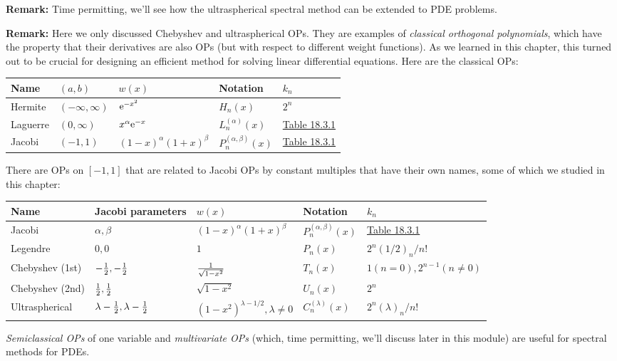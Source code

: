 \documentclass[12pt,a4paper]{article}
\begin{document}
\textbf{Remark:} Time permitting, we'll see how the ultraspherical spectral method can be extended to PDE problems.

\textbf{Remark:} Here we only discussed Chebyshev and ultraspherical OPs.  They are examples of \emph{classical orthogonal polynomials}, which have the property that their derivatives are also OPs (but with respect to different weight functions).  As we learned in this chapter, this turned out to be crucial for designing an efficient method for solving linear differential equations. Here are the classical OPs:

\begin{tabular}
{l | l | l | l | l}
Name & $(a,b)$ & $w(x)$ & Notation & $k_n$ \\
\hline
Hermite & $(-\infty,\infty)$ & ${\rm e}^{-x^2}$ & $H_n(x)$ & $2^n$ \\
Laguerre & $(0,\infty)$ & $x^\alpha {\rm e}^{-x}$ & $L_n^{(\alpha)}(x)$ & \href{http://dlmf.nist.gov/18.3}{Table 18.3.1} \\
Jacobi & $(-1,1)$ & $(1-x)^{\alpha} (1+x)^\beta$ & $P_n^{(\alpha,\beta)}(x)$ & \href{http://dlmf.nist.gov/18.3}{Table 18.3.1} \\
\end{tabular}
There are OPs on $[-1, 1]$ that are related to Jacobi OPs by constant multiples that have their own names, some of which we studied in this chapter:

\begin{tabular}
{l | l | l | l | l}
Name & Jacobi parameters & $w(x)$ & Notation & $k_n$ \\
\hline
Jacobi & $\alpha,\beta$ & $(1-x)^{\alpha} (1+x)^\beta$ & $P_n^{(\alpha,\beta)}(x)$ & \href{http://dlmf.nist.gov/18.3}{Table 18.3.1} \\
Legendre & $0,0$ & $1$ & $P_n(x)$ & $2^n(1/2)_n/n!$ \\
Chebyshev (1st) & $-{1 \over 2},-{1 \over 2}$ & $1 \over \sqrt{1-x^2}$ & $T_n(x)$ & $1 (n=0), 2^{n-1} (n \neq 0)$ \\
Chebyshev (2nd) & ${1 \over 2},{1 \over 2}$ & $\sqrt{1-x^2}$ & $U_n(x)$ & $2^n$ \\
Ultraspherical & $\lambda-{1 \over 2},\lambda-{1 \over 2}$ & $(1-x^2)^{\lambda - 1/2}, \lambda \neq 0$ & $C_n^{(\lambda)}(x)$ & $2^n(\lambda)_n/n!$ \\
\end{tabular}
\emph{Semiclassical OPs} of one variable and \emph{multivariate OPs} (which, time permitting, we'll discuss later in this module) are useful for spectral methods for PDEs.
\end{document}

